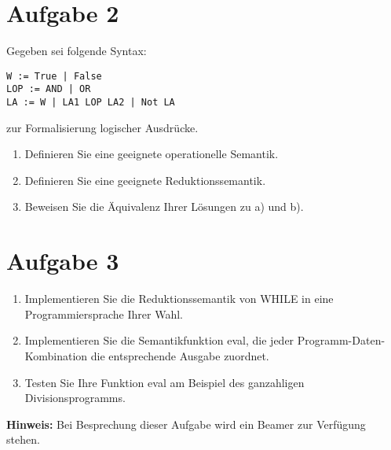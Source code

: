 \documentclass[ngerman,a4paper]{report}
\begin{document}
\section*{Aufgabe 2}
Gegeben sei folgende Syntax:
\begin{lstlisting}
W := True | False
LOP := AND | OR
LA := W | LA1 LOP LA2 | Not LA
\end{lstlisting}
zur Formalisierung logischer Ausdrücke.
\begin{enumerate}
\item Definieren Sie eine geeignete operationelle Semantik.
\item Definieren Sie eine geeignete Reduktionssemantik.
\item Beweisen Sie die Äquivalenz Ihrer Lösungen zu a) und b).
\end{enumerate}
\section*{Aufgabe 3 }
\begin{enumerate}
	\item Implementieren Sie die Reduktionssemantik von WHILE in eine Programmiersprache Ihrer Wahl.
	\item Implementieren Sie die Semantikfunktion eval, die jeder Programm-Daten-Kombination die entsprechende Ausgabe zuordnet.
	\item Testen Sie Ihre Funktion eval am Beispiel des ganzahligen Divisionsprogramms.
\end{enumerate}
\textbf{Hinweis:} Bei Besprechung dieser Aufgabe wird ein Beamer zur Verfügung stehen.
\end{document}
